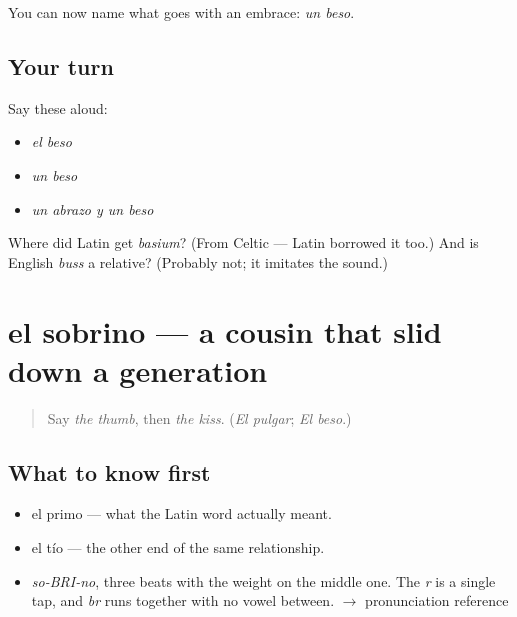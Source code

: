 \begin{grammarlens}[title={What you've built}]
You can now name what goes with an embrace: \emph{un beso}.
\end{grammarlens}

\subsection*{Your turn}
Say these aloud:

\begin{itemize}
\raggedright
  \item \emph{el beso}
  \item \emph{un beso}
  \item \emph{un abrazo y un beso}
\end{itemize}

\begin{tcolorbox}[breakable,colback=teal!4,colframe=teal!35!black,title={Before you move on}]
Where did Latin get \emph{basium}? (From Celtic — Latin borrowed it too.) And is English \emph{buss} a relative? (Probably not; it imitates the sound.)
\end{tcolorbox}
\section[el sobrino]{el sobrino — a cousin that slid down a generation}

\label{lesson:ES-C375-sobrino}



\begin{quote}
Say \emph{the thumb}, then \emph{the kiss}. (\emph{El pulgar}; \emph{El beso}.)
\end{quote}

\subsection*{What to know first}
\begin{itemize}
\raggedright
  \item el primo — what the Latin word actually meant.
  \item el tío — the other end of the same relationship.
\end{itemize}

\begin{sounds}
\begin{itemize}
\raggedright
  \item \emph{so-BRI-no}, three beats with the weight on the middle one. The \emph{r} is a single tap, and \emph{br} runs together with no vowel between. $\to$ pronunciation reference
\end{itemize}
\end{sounds}

